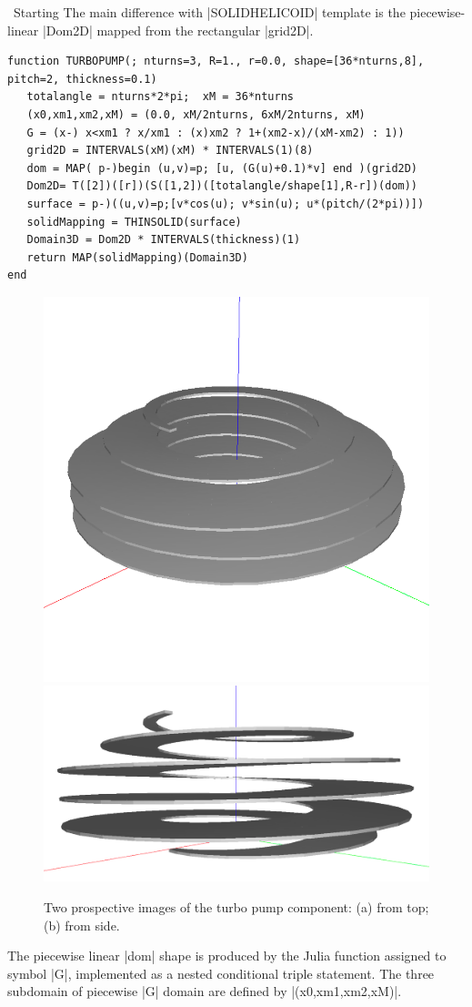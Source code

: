 \begin{coding}
\begin{coding}\ 
Starting
The main difference with |SOLIDHELICOID| template is the piecewise-linear |Dom2D| mapped from the rectangular |grid2D|.
\begin{lstlisting}[language=JuliaLocal, style=julia, mathescape=true]
function TURBOPUMP(; nturns=3, R=1., r=0.0, shape=[36*nturns,8], pitch=2, thickness=0.1)
   totalangle = nturns*2*pi;  xM = 36*nturns 
   (x0,xm1,xm2,xM) = (0.0, xM/2nturns, 6xM/2nturns, xM)
   G = (x-) x<xm1 ? x/xm1 : (x)xm2 ? 1+(xm2-x)/(xM-xm2) : 1))
   grid2D = INTERVALS(xM)(xM) * INTERVALS(1)(8)
   dom = MAP( p-)begin (u,v)=p; [u, (G(u)+0.1)*v] end )(grid2D)
   Dom2D= T([2])([r])(S([1,2])([totalangle/shape[1],R-r])(dom)) 
   surface = p-)((u,v)=p;[v*cos(u); v*sin(u); u*(pitch/(2*pi))]) 
   solidMapping = THINSOLID(surface)
   Domain3D = Dom2D * INTERVALS(thickness)(1)
   return MAP(solidMapping)(Domain3D)
end
\end{lstlisting}
\end{coding}


\begin{figure}[hbp] %
   \includegraphics[width=0.337\linewidth]{chapter-04/figs/turbo-pump01}%
   \includegraphics[width=0.663\linewidth]{chapter-04/figs/turbo-pump02}%
\caption{Two prospective images of the turbo pump component: (a) from top; (b) from side.}
\label{fig:turbopump}
\end{figure}

The piecewise linear |dom| shape is produced by the Julia function assigned to symbol |G|, implemented as a nested conditional triple statement. The three subdomain of piecewise |G| domain are defined by |(x0,xm1,xm2,xM)|.


\end{coding}
